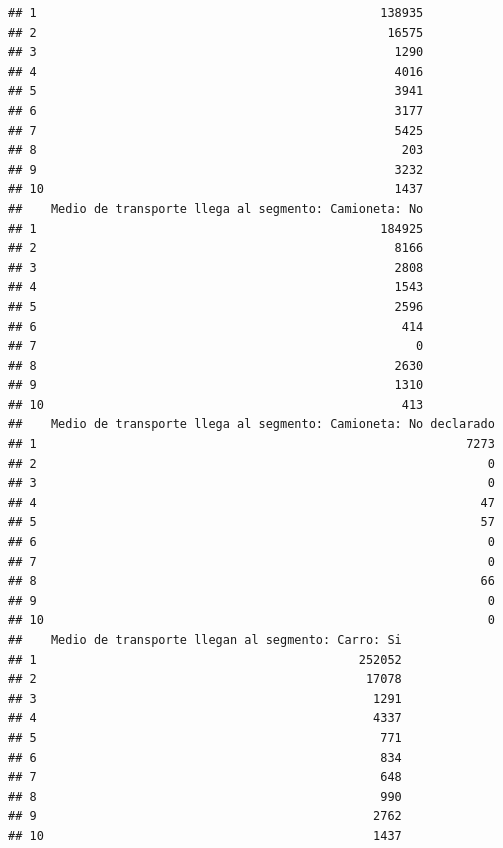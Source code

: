 \documentclass[11pt,]{article}
\begin{document}
\begin{verbatim}
## 1                                                138935
## 2                                                 16575
## 3                                                  1290
## 4                                                  4016
## 5                                                  3941
## 6                                                  3177
## 7                                                  5425
## 8                                                   203
## 9                                                  3232
## 10                                                 1437
##    Medio de transporte llega al segmento: Camioneta: No
## 1                                                184925
## 2                                                  8166
## 3                                                  2808
## 4                                                  1543
## 5                                                  2596
## 6                                                   414
## 7                                                     0
## 8                                                  2630
## 9                                                  1310
## 10                                                  413
##    Medio de transporte llega al segmento: Camioneta: No declarado
## 1                                                            7273
## 2                                                               0
## 3                                                               0
## 4                                                              47
## 5                                                              57
## 6                                                               0
## 7                                                               0
## 8                                                              66
## 9                                                               0
## 10                                                              0
##    Medio de transporte llegan al segmento: Carro: Si
## 1                                             252052
## 2                                              17078
## 3                                               1291
## 4                                               4337
## 5                                                771
## 6                                                834
## 7                                                648
## 8                                                990
## 9                                               2762
## 10                                              1437

\end{verbatim}
\end{document}
